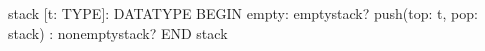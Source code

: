 stack [t: TYPE]:  DATATYPE
 BEGIN
  empty: emptystack?
  push(top: t, pop: stack) : nonemptystack?
 END stack

